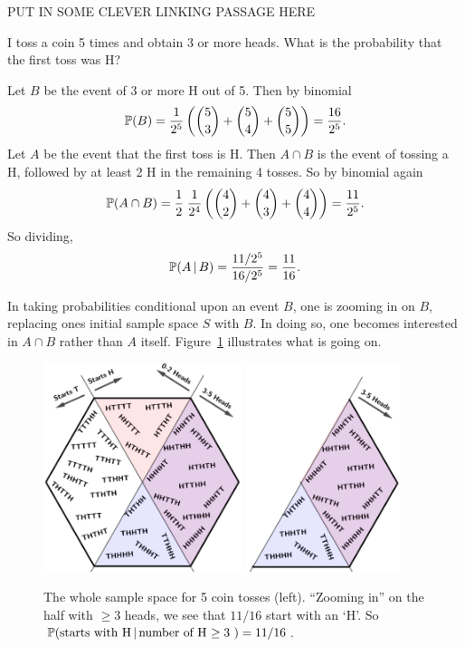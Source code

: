 \begin{center}
    PUT IN SOME CLEVER LINKING PASSAGE HERE
\end{center}
I toss a coin 5 times and obtain 3 or more heads.  What is the probability that the first toss was H? 

Let $B$ be the event of 3 or more H out of 5.  Then by binomial 
 \[
     {\mathbb P}( B) = \frac1{2^5}\left(  \binom53 + \binom54 + \binom55 \right)   =  \frac{16}{2^5}.
 \]
Let $A$ be the event that the first toss is H.  Then $A \cap B$ is the event of tossing a H, followed by at least 2 H in the remaining 4 tosses. So by binomial again 
 \[
   {\mathbb P}(A \cap B) = \frac12 \; \frac1{2^4} \left(  \binom42 + \binom43 +\binom 44\right) = \frac{11}{2^5}.
 \]
 So dividing, 
  \[
  {\mathbb P}(A \, | \, B) = \frac{11/2^5}{16/2^5} = \frac{11}{16}.  
 \]

In taking probabilities conditional upon an event $B$, one is zooming in on $B$, replacing ones initial sample space $S$ with $B$. In doing so, one becomes interested in $A \cap B$ rather than $A$ itself.  Figure~\ref{condo} illustrates what is going on. 

\begin{figure}[h] \centering
\includegraphics[width=0.52\textwidth]{existing-materials/ProbabilityNotes_23-24/images/condo0.png}\qquad
\includegraphics[width=0.4\textwidth]{existing-materials/ProbabilityNotes_23-24/images/condo1.png}
\caption{\label{condo} The whole sample space for 5 coin tosses (left). ``Zooming in'' on the half with $\geq 3$ heads, we see that $11/16$ start with an `H'. So ${\mathbb P}(\text{starts with H} \, | \, \text{number of H $\geq 3$ }) = 11/16$.} 
\end{figure}

